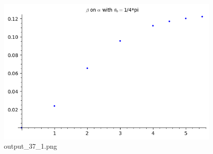 \documentclass[11pt]{article}
\begin{document}

\begin{figure}
\centering
\includegraphics{output_37_1.png}
\caption{output\_37\_1.png}
\end{figure}


    
\end{document}
